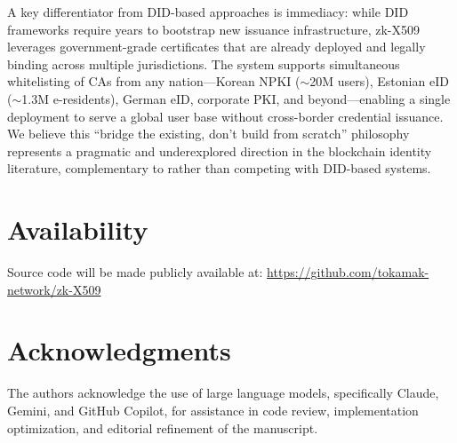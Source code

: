 \documentclass[11pt, a4paper]{article}
\begin{document}
A key differentiator from DID-based approaches is immediacy: while DID
frameworks require years to bootstrap new issuance infrastructure,
zk-X509 leverages government-grade certificates that are already
deployed and legally binding across multiple jurisdictions. The system
supports simultaneous whitelisting of CAs from any nation---Korean NPKI
($\sim$20M users), Estonian eID ($\sim$1.3M
e-residents), German eID, corporate PKI, and beyond---enabling a single
deployment to serve a global user base without cross-border credential
issuance. We believe this ``bridge the existing, don't build from
scratch'' philosophy represents a pragmatic and underexplored direction
in the blockchain identity literature, complementary to rather than
competing with DID-based systems.


\section*{Availability}

Source code will be made publicly available at:
\url{https://github.com/tokamak-network/zk-X509}

\section*{Acknowledgments}

The authors acknowledge the use of large language models, specifically Claude, Gemini, and GitHub Copilot, for assistance in code review, implementation optimization, and editorial refinement of the manuscript.



\end{document}
